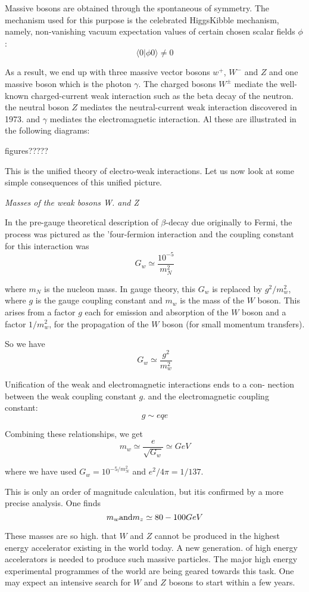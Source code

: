Massive bosons are obtained through the spontaneous of
symmetry. The mechanism used for this purpose is the celebrated HiggsKibble mechanism, namely, non-vanishing  vacuum expectation values of certain chosen scalar fields $\phi$:
$$
\langle 0 | \phi 0 \rangle \neq 0
$$

As a result, we end up with three massive vector bosons $w^{+}$, $W^{-}$ and
$Z$ and one massive boson which is the photon $\gamma$. The charged bosons $W^{\pm}$
mediate the well-known charged-current weak interaction such as the beta
decay of the neutron. the neutral boson $Z$ mediates the neutral-current
weak interaction discovered in 1973. and $\gamma$ mediates the electromagnetic
interaction. Al these are illustrated in the following diagrams: 
 
figures?????

This is the unified theory of electro-weak interactions. Let us now look
at some simple consequences of this unified picture. 

{\it Masses of the weak bosons W. and Z }

In the pre-gauge theoretical description of $\beta$-decay due originally to
Fermi, the process was pictured as the
'four-fermion interaction and the coupling
constant for this interaction was 
$$
G_{w}\simeq \frac{10^{-5}}{m^{2}_{N}}
$$

where $m_{N}$ is the nucleon mass. In gauge
theory, this $G_{w}$ is replaced by $g^{2}/m^{2}_{w}$, where
$g$ is the gauge coupling constant and $m_{w}$
is the mass of the $W$ boson. This arises
from a factor $g$ each for emission and absorption of the $W$ boson and a
factor $1/m^{2}_{w}$, for the propagation of the $W$ boson (for small momentum
transfers). 

So we have 
$$
G_{w}\simeq \frac{g^{2}}{m^{2}_{w}}
$$

Unification of the weak and electromagnetic interactions ends to a con-
nection between the weak coupling constant $g$. and the electromagnetic
coupling constant: 
$$
g \sim eq e
$$

Combining these relationships, we get 
$$
m_{w} \simeq \frac{e}{\sqrt{G_{w}}} \simeq GeV
$$

where we have used $G_{w}= 10^{-5/m^{2}_{N}}$ and $e^{2}/4\pi = 1/137$.

This is only an order of magnitude calculation, but itis confirmed by a
more precise analysis. One finds 
$$
m_{w} {\rm and } m_{z} \simeq 80-100 GeV
$$

These masses are so high. that $W$ and $Z$ cannot be produced in the
highest energy accelerator existing in the world today. A new generation.
of high energy accelerators is needed to produce such massive particles. 
The major high energy experimental programmes of the world are being
geared towards this task. One may expect an intensive search for $W$ and
$Z$ bosons to start within a few years. 

